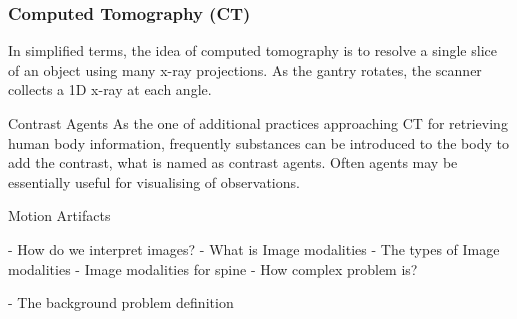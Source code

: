 \subsubsection{Computed Tomography (CT)}
In simplified terms, the idea of computed tomography is to resolve a single slice of an object using many x-ray projections. As the gantry rotates, the scanner collects a 1D x-ray at each angle.

\item Contrast Agents
\newline
As the one of additional practices approaching CT for retrieving human body information, frequently substances can be introduced to the body to add the contrast, what is named as contrast agents. Often agents may be essentially useful for visualising of observations.          

\item Motion Artifacts
\newline




- How do we interpret images?
    - What is Image modalities
	- The types of Image modalities
    - Image modalities for spine
    - How complex problem is?
    
- The background problem definition
  
